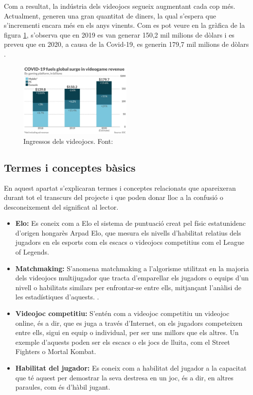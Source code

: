 \documentclass[a4paper]{article}
\begin{document}
Com a resultat, la indústria dels videojocs segueix augmentant cada cop més. Actualment, generen una gran quantitat de diners, la qual s'espera que s'incrementi encara més en els anys vinents. Com es pot veure en la gràfica de la figura \ref{fig:VideogamesRevenuesImage}, s'observa que en 2019 es van generar 150,2 mil milions de dòlars i es preveu que en 2020, a causa de la Covid-19, es generin 179,7 mil milions de dòlars \cite{VidogamesMoreMoney}. 

\begin{figure}[H]
    \centering
    \includegraphics[width=0.5\textwidth]{images/videogamesMoney.jpeg}
    \caption{Ingressos dels videojocs. Font: \cite{VidogamesMoreMoney}}
    \label{fig:VideogamesRevenuesImage}
\end{figure}

\subsection{Termes i conceptes bàsics}
En aquest apartat s'explicaran termes i conceptes relacionats que apareixeran durant tot el transcurs del projecte i que poden donar lloc a la confusió o desconeixement del significat al lector.

\begin{itemize}
\item \textbf{Elo:} Es coneix com a Elo el sistema de puntuació creat pel físic estatunidenc d'origen hongarès Arpad Elo, que mesura els nivells d'habilitat relatius dels jugadors en els esports com els escacs o videojocs competitius com el League of Legends. \cite{wikipediaElo}

\item \textbf{Matchmaking:} S'anomena matchmaking a l'algorisme utilitzat en la majoria dels videojocs multijugador que tracta d'emparellar els jugadors o equips d'un nivell o habilitats similars per enfrontar-se entre ells, mitjançant l'anàlisi de les estadístiques d'aquests. \cite{matchmakingDef}.

\item \textbf{Videojoc competitiu:} S'entén com a videojoc competitiu un videojoc online, és a dir, que es juga a través d'Internet, on els jugadors competeixen entre ells, sigui en equip o individual, per ser uns millors que els altres. Un exemple d'aquests poden ser els escacs o els jocs de lluita, com el Street Fighters o Mortal Kombat.

\item \textbf{Habilitat del jugador:} Es coneix com a habilitat del jugador a la capacitat que té aquest per demostrar la seva destresa en un joc, és a dir, en altres paraules, com és d'hàbil jugant.
\end{itemize}
\end{document}

